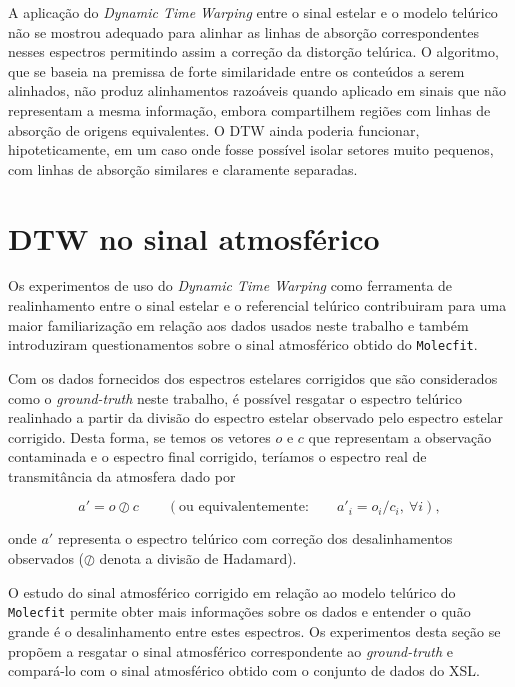 A aplicação do \textit{Dynamic Time Warping} entre o sinal estelar e o modelo telúrico não se mostrou adequado para alinhar as linhas de absorção correspondentes nesses espectros permitindo assim a correção da distorção telúrica. O algoritmo, que se baseia na premissa de forte similaridade entre os conteúdos a serem alinhados, não produz alinhamentos razoáveis quando aplicado em sinais que não representam a mesma informação, embora compartilhem regiões com linhas de absorção de origens equivalentes. O DTW ainda poderia funcionar, hipoteticamente, em um caso onde fosse possível isolar setores muito pequenos, com linhas de absorção similares e claramente separadas.


\section{DTW no sinal atmosférico}

Os experimentos de uso do \textit{Dynamic Time Warping} como ferramenta de realinhamento entre o sinal estelar e o referencial telúrico contribuiram para uma maior familiarização em relação aos dados usados neste trabalho e também introduziram questionamentos sobre o sinal atmosférico obtido do \texttt{Molecfit}.

Com os dados fornecidos dos espectros estelares corrigidos que são considerados como o \textit{ground-truth} neste trabalho, é possível resgatar o espectro telúrico realinhado a partir da divisão do espectro estelar observado pelo espectro estelar corrigido. Desta forma, se temos os vetores $o$ e $c$ que representam a observação contaminada e o espectro final corrigido, teríamos o espectro real de transmitância da atmosfera dado por

\begin{equation*}
    a' = o \oslash c \qquad \left(\mbox{ou equivalentemente:} \qquad a'_{i} = o_i / c_i,\ \forall i\right),
\end{equation*}

\noindent onde $a'$ representa o espectro telúrico com correção dos desalinhamentos observados ($\oslash$ denota a divisão de Hadamard).

O estudo do sinal atmosférico corrigido em relação ao modelo telúrico do \texttt{Molecfit} permite obter mais informações sobre os dados e entender o quão grande é o desalinhamento entre estes espectros. Os experimentos desta seção se propõem a resgatar o sinal atmosférico correspondente ao \textit{ground-truth} e compará-lo com o sinal atmosférico obtido com o conjunto de dados do XSL.

